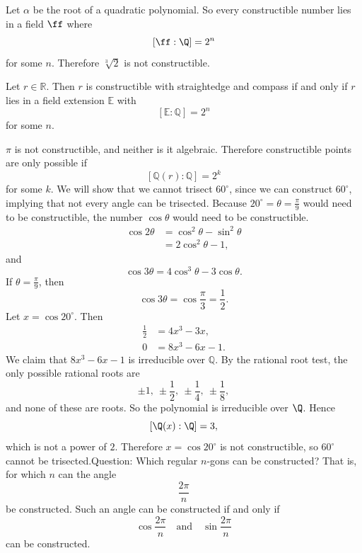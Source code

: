 Let $\alpha$ be the root of a quadratic polynomial.
So every constructible number lies in a field $\ff$ where
\[
    [\ff:\Q]=2^n
\]
for some $n$.
Therefore $\sqrt[3]{2}$ is not constructible.

\begin{lemma*}{
    Let $r\in\mathbb{R}$.
    Then $r$ is constructible with straightedge and compass if and only if $r$ lies in a field extension $\mathbb{E}$ with
    \[
        [\mathbb{E}:\mathbb{Q}]=2^n
    \]
    for some $n$.
}
\end{lemma*}

$\pi$ is not constructible, and neither is it algebraic.
Therefore constructible points are only possible if
\[
    [\mathbb{Q}(r):\mathbb{Q}]=2^k
\]
for some $k$.
We will show that we cannot trisect $60^\circ$, since we can construct $60^\circ$, implying that not every angle can be trisected.
Because $20^\circ=\theta=\frac{\pi}{9}$ would need to be constructible, the number $\cos\theta$ would need to be constructible.
\begin{align*}
    \cos 2\theta &= \cos^2\theta-\sin^2\theta\\
    &= 2\cos^2\theta-1,
\end{align*}
and
\[
    \cos 3\theta=4\cos^3\theta-3\cos\theta.
\]
If $\theta=\frac{\pi}{9}$, then
\[
    \cos 3\theta=\cos\frac{\pi}{3}=\frac{1}{2}.
\]
Let $x=\cos 20^\circ$.
Then
\begin{align*}
    \frac{1}{2} &= 4x^3-3x,\\
    0 &= 8x^3-6x-1.
\end{align*}
We claim that $8x^3-6x-1$ is irreducible over $\mathbb{Q}$.
By the rational root test, the only possible rational roots are
\[
    \pm 1,\ \pm \frac{1}{2},\ \pm \frac{1}{4},\ \pm \frac{1}{8},
\]
and none of these are roots.
So the polynomial is irreducible over $\Q$.
Hence
\[
    [\Q(x):\Q]=3,
\]
which is not a power of $2$.
Therefore $x=\cos 20^\circ$ is not constructible, so $60^\circ$ cannot be trisected.Question:
Which regular $n$-gons can be constructed?
That is, for which $n$ can the angle
\[
    \frac{2\pi}{n}
\]
be constructed.
Such an angle can be constructed if and only if
\[
    \cos \frac{2\pi}{n}
    \quad\text{and}\quad
    \sin \frac{2\pi}{n}
\]
can be constructed.
